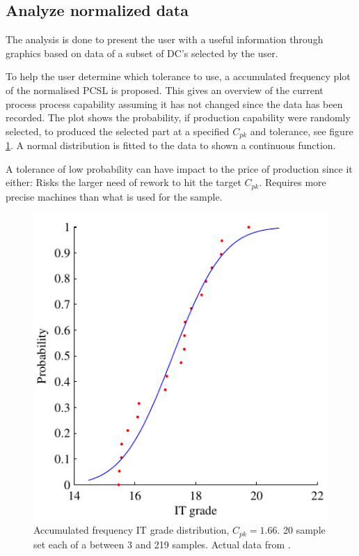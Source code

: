 \documentclass[aip,amsmath, reprint, author-year]{revtex4-1}
\begin{document}
\subsection{Analyze normalized data}

The analysis is done to present the user with a useful information through graphics based on data of  a subset of DC's selected by the user. 

To help the user determine which tolerance to use, a accumulated frequency plot of the normalised PCSL is proposed. 
This gives an overview of the current process process capability assuming it has not changed since the data has been recorded. 
The plot shows the probability, if production capability were randomly selected, to produced the selected part at a specified $C_{pk}$ and tolerance, see figure \ref{fig:acumfreq}. 
A normal distribution is fitted to the data to shown a continuous function.

A tolerance of low probability can have impact to the price of production since it either: Risks the larger need of rework to hit the target $C_{pk}$. Requires more precise machines than what is used for the sample.

\begin{figure}
\includegraphics{Acum_freqIT.pdf}
\caption{\label{fig:acumfreq} Accumulated frequency IT grade distribution, $C_{pk} =1.66$. 
20 sample set each of a between 3 and 219 samples. Actual data from \cite{thornton2000use}. }
\end{figure}
\end{document}
